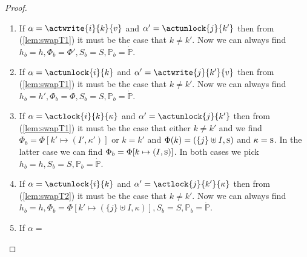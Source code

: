\begin{lem}
\begin{proof}
\begin{enumerate}[label=({\roman*})]
		\item If $\alpha = \actwrite{i}{k}{v}$ and $\alpha' = \actunlock{j}{k'}$ then from (\ref{lem:swapT1}) it must be the case that $k \neq k'$. Now we can always find $h_b = h, \Phi_b = \Phi', S_b = S, \mathds{P}_b = \dot{\mathds{P}}$.
		
		\item If $\alpha = \actunlock{i}{k}$ and $\alpha' = \actwrite{j}{k'}{v}$ then from (\ref{lem:swapT1}) it must be the case that $k \neq k'$. Now we can always find $h_b = h', \Phi_b = \Phi, S_b = S, \mathds{P}_b = \dot{\mathds{P}}$.
		
		\item If $\alpha = \actlock{i}{k}{\kappa}$ and $\alpha' = \actunlock{j}{k'}$ then from (\ref{lem:swapT1}) it must be the case that either $k \neq k'$ and we find $\Phi_b = \Phi[k' \mapsto (I', \kappa')]$ or $k = k'$ and $\Phi(k) = (\{j\} \uplus I, \textsc{s})$ and $\kappa = \textsc{s}$. In the latter case we can find $\Phi_b = \Phi[k \mapsto (I, \textsc{s})]$. In both cases we pick $h_b = h, S_b = S, \mathds{P}_b = \dot{\mathds{P}}$.
		
		\item If $\alpha = \actunlock{i}{k}$ and $\alpha' = \actlock{j}{k'}{\kappa}$ then from (\ref{lem:swapT2}) it must be the case that $k \neq k'$. Now we can always find $h_b = h, \Phi_b = \Phi[k' \mapsto (\{j\} \uplus I, \kappa)], S_b = S, \mathds{P}_b = \dot{\mathds{P}}$.
		
		\item If $\alpha = $
	\end{enumerate}
	\end{proof}
\end{lem}

